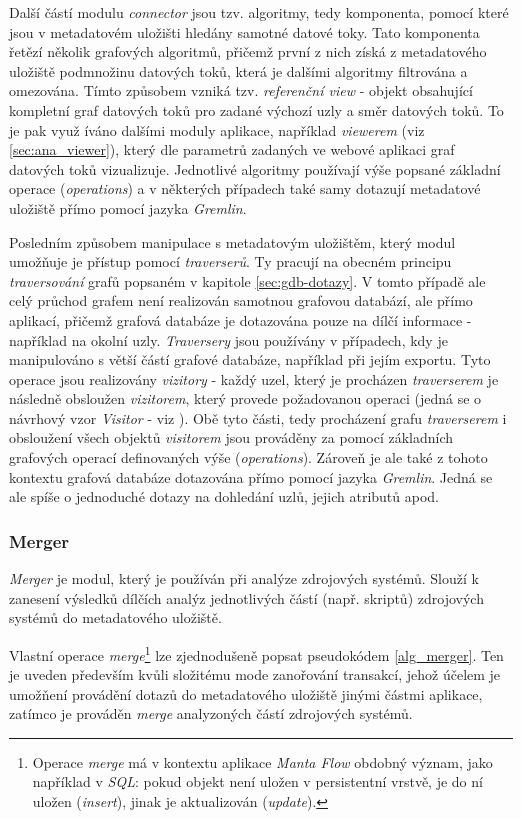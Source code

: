 Další částí modulu \textit{connector} jsou tzv. algoritmy, tedy komponenta, pomocí které jsou v metadatovém uložišti hledány samotné datové toky. Tato komponenta řetězí několik grafových algoritmů, přičemž první z nich získá z metadatového uložiště podmnožinu datových toků, která je dalšími algoritmy filtrována a omezována. Tímto způsobem vzniká tzv. \textit{referenční view} - objekt obsahující kompletní graf datových toků pro zadané výchozí uzly a směr datových toků. To je pak využ   íváno dalšími moduly aplikace, například \textit{viewerem} (viz \ref{sec:ana_viewer}), který dle parametrů zadaných ve webové aplikaci graf datových toků vizualizuje.
Jednotlivé algoritmy používají výše popsané základní operace (\textit{operations}) a v některých případech také samy dotazují metadatové uložiště přímo pomocí jazyka \textit{Gremlin}.

Posledním způsobem manipulace s metadatovým uložištěm, který modul umožňuje je přístup pomocí \textit{traverserů}. Ty pracují na obecném principu \textit{traversování} grafů popsaném v kapitole \ref{sec:gdb-dotazy}. V tomto případě ale celý průchod grafem není realizován samotnou grafovou databází, ale přímo aplikací, přičemž grafová databáze je dotazována pouze na dílčí informace - například na okolní uzly. \textit{Traversery} jsou používány v případech, kdy je manipulováno s větší částí grafové databáze, například při jejím exportu. Tyto operace jsou realizovány \textit{vizitory} - každý uzel, který je procházen \textit{traverserem} je následně obsloužen \textit{vizitorem}, který provede požadovanou operaci (jedná se o návrhový vzor \textit{Visitor} - viz \cite{Gamma94}). Obě tyto části, tedy procházení grafu \textit{traverserem} i obsloužení všech objektů \textit{visitorem} jsou prováděny za pomocí základních grafových operací definovaných výše (\textit{operations}). Zároveň je ale také z tohoto kontextu grafová databáze dotazována přímo pomocí jazyka \textit{Gremlin}. Jedná se ale spíše o jednoduché dotazy na dohledání uzlů, jejich atributů apod.

\subsubsection{Merger}
\label{sec:ana_merger}
\textit{Merger} je modul, který je používán při analýze zdrojových systémů. Slouží k zanesení výsledků dílčích analýz jednotlivých částí (např. skriptů) zdrojových systémů do metadatového uložiště.

Vlastní operace \textit{merge}\footnote{Operace \textit{merge} má v kontextu aplikace \textit{Manta Flow} obdobný význam, jako například v \textit{SQL}: pokud objekt není uložen v persistentní vrstvě, je do ní uložen (\textit{insert}), jinak je aktualizován (\textit{update}).} lze zjednodušeně popsat pseudokódem \ref{alg_merger}. Ten je uveden především kvůli složitému mode zanořování transakcí, jehož účelem je umožňení provádění dotazů do metadatového uložiště jinými částmi aplikace, zatímco je prováděn \textit{merge} analyzoných částí zdrojových systémů. %

